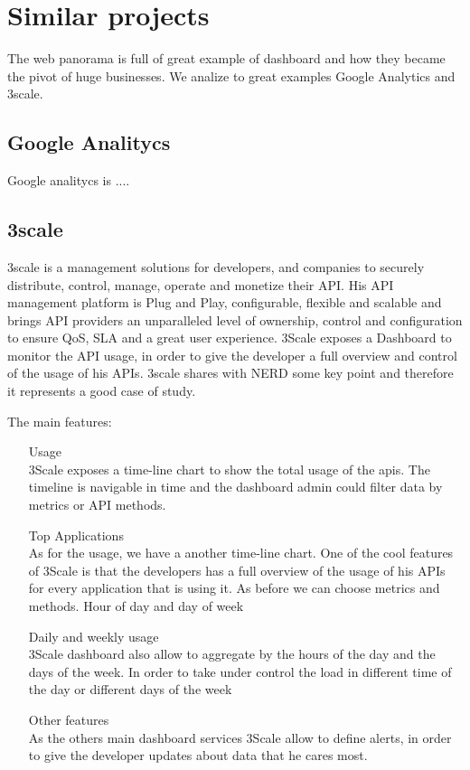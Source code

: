 \documentclass[a4paper,12pt]{report}
\begin{document}
\chapter{Similar projects}

The web panorama is full of great example of dashboard and how they became the pivot of huge businesses.
We analize to great examples Google Analytics and 3scale.
\section{Google Analitycs}
Google analitycs is ....
\section{3scale}
3scale is a management solutions for developers, and companies to securely distribute, control, manage, operate and monetize their API. His API management platform is Plug and Play, configurable, flexible and scalable and brings API providers an unparalleled level of ownership, control and configuration to ensure QoS, SLA and a great user experience.
3Scale exposes a Dashboard to monitor the API usage, in order to give the developer a full overview and control of the usage of his APIs.
3scale shares with NERD some key point and therefore it  represents a good case of study.

The main features:
\begin{itemize}
\item[Usage] \hfill \\
 3Scale exposes a time-line chart to show the total usage of the apis. The timeline is navigable in time and the dashboard admin could filter data by  metrics or API methods.

\item[Top Applications] \hfill \\
As for the usage, we have a another time-line chart. One of the cool features of 3Scale is that the developers has a full overview of the usage of his APIs for every application that is using it. As before we can choose metrics and methods.
Hour of day and day of week

\item[Daily and weekly usage] \hfill \\
 3Scale dashboard also allow to aggregate by the hours of the day and the days of the week. In order to take under control the load in different time of the day or different days of the week


\item[Other features] \hfill \\
As the others main dashboard services 3Scale allow to define alerts, in order to give the developer updates about data that he cares most.
\end{itemize}
\end{document}
